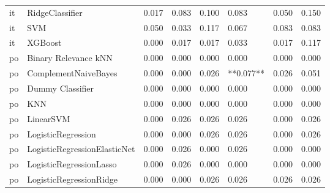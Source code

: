 \begin{tabular}{llllllll}
      it &                 RidgeClassifier &     0.017 &                     0.083 &                 0.100 &                  0.083 &                                   0.050 &     0.150 \\
      it &                             SVM &     0.050 &                     0.033 &                 0.117 &                  0.067 &                                   0.083 &     0.083 \\
      it &                         XGBoost &     0.000 &                     0.017 &                 0.017 &                  0.033 &                                   0.017 &     0.117 \\
      po &            Binary Relevance kNN &     0.000 &                     0.000 &                 0.000 &                  0.000 &                                   0.000 &     0.000 \\
      po &            ComplementNaiveBayes &     0.000 &                     0.000 &                 0.026 &              **0.077** &                                   0.026 &     0.051 \\
      po &                Dummy Classifier &     0.000 &                     0.000 &                 0.000 &                  0.000 &                                   0.000 &     0.000 \\
      po &                             KNN &     0.000 &                     0.000 &                 0.000 &                  0.000 &                                   0.000 &     0.000 \\
      po &                       LinearSVM &     0.000 &                     0.026 &                 0.026 &                  0.026 &                                   0.000 &     0.026 \\
      po &              LogisticRegression &     0.000 &                     0.000 &                 0.026 &                  0.026 &                                   0.000 &     0.026 \\
      po &    LogisticRegressionElasticNet &     0.000 &                     0.026 &                 0.000 &                  0.026 &                                   0.000 &     0.000 \\
      po &         LogisticRegressionLasso &     0.000 &                     0.026 &                 0.000 &                  0.000 &                                   0.000 &     0.000 \\
      po &         LogisticRegressionRidge &     0.000 &                     0.000 &                 0.026 &                  0.026 &                                   0.026 &     0.026 \\

\end{tabular}
